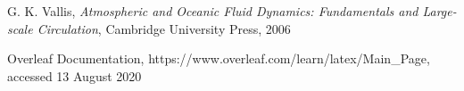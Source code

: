 \documentclass[25pt,a1paper,landscape,
               margin=0.5cm,colspace=1.25cm,
               subcolspace=-0.5cm,blockverticalspace=1.25cm]{tikzposter}
\begin{document}
\begin{columns}
\begin{subcolumns}
{{\begin{thebibliography}{9}
G. K. Vallis,
\emph{Atmospheric and Oceanic Fluid Dynamics: Fundamentals and Large-scale Circulation}, Cambridge University Press, 2006

Overleaf Documentation, https://www.overleaf.com/learn/latex/Main\_Page, accessed 13 August 2020
\end{thebibliography}
}
}

\end{subcolumns}

\end{columns}
\end{document}
